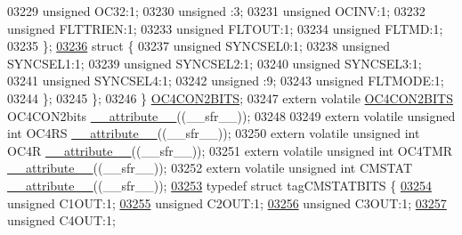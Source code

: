 \begin{DoxyCode}
03229       \textcolor{keywordtype}{unsigned} OC32:1;
03230       \textcolor{keywordtype}{unsigned} :3;
03231       \textcolor{keywordtype}{unsigned} OCINV:1;
03232       \textcolor{keywordtype}{unsigned} FLTTRIEN:1;
03233       \textcolor{keywordtype}{unsigned} FLTOUT:1;
03234       \textcolor{keywordtype}{unsigned} FLTMD:1;
03235     \};
\hypertarget{a00015_source_l03236}{}\hyperlink{a00015}{03236}     \textcolor{keyword}{struct }\{
03237       \textcolor{keywordtype}{unsigned} SYNCSEL0:1;
03238       \textcolor{keywordtype}{unsigned} SYNCSEL1:1;
03239       \textcolor{keywordtype}{unsigned} SYNCSEL2:1;
03240       \textcolor{keywordtype}{unsigned} SYNCSEL3:1;
03241       \textcolor{keywordtype}{unsigned} SYNCSEL4:1;
03242       \textcolor{keywordtype}{unsigned} :9;
03243       \textcolor{keywordtype}{unsigned} FLTMODE:1;
03244     \};
03245   \};
03246 \} \hyperlink{a00014_d9/d1d/a00633}{OC4CON2BITS};
03247 \textcolor{keyword}{extern} \textcolor{keyword}{volatile} \hyperlink{a00014_d9/d1d/a00633}{OC4CON2BITS} OC4CON2bits \hyperlink{a00015_a493c46f03454991ccc5aa7a6e1dfb2a7}{\_\_attribute\_\_}((\_\_sfr\_\_));
03248 
03249 \textcolor{keyword}{extern} \textcolor{keyword}{volatile} \textcolor{keywordtype}{unsigned} \textcolor{keywordtype}{int}  OC4RS \hyperlink{a00015_a493c46f03454991ccc5aa7a6e1dfb2a7}{\_\_attribute\_\_}((\_\_sfr\_\_));
03250 \textcolor{keyword}{extern} \textcolor{keyword}{volatile} \textcolor{keywordtype}{unsigned} \textcolor{keywordtype}{int}  OC4R \hyperlink{a00015_a493c46f03454991ccc5aa7a6e1dfb2a7}{\_\_attribute\_\_}((\_\_sfr\_\_));
03251 \textcolor{keyword}{extern} \textcolor{keyword}{volatile} \textcolor{keywordtype}{unsigned} \textcolor{keywordtype}{int}  OC4TMR \hyperlink{a00015_a493c46f03454991ccc5aa7a6e1dfb2a7}{\_\_attribute\_\_}((\_\_sfr\_\_));
03252 \textcolor{keyword}{extern} \textcolor{keyword}{volatile} \textcolor{keywordtype}{unsigned} \textcolor{keywordtype}{int}  CMSTAT \hyperlink{a00015_a493c46f03454991ccc5aa7a6e1dfb2a7}{\_\_attribute\_\_}((\_\_sfr\_\_));
\hypertarget{a00015_source_l03253}{}\hyperlink{a00014}{03253} \textcolor{keyword}{typedef} \textcolor{keyword}{struct }tagCMSTATBITS \{
\hypertarget{a00015_source_l03254}{}\hyperlink{a00014_ac92ec38a908579dba4576b58d83b448b}{03254}   \textcolor{keywordtype}{unsigned} C1OUT:1;
\hypertarget{a00015_source_l03255}{}\hyperlink{a00014_a97b4baf2ebfd7bb4d0a6f4be6665c7ab}{03255}   \textcolor{keywordtype}{unsigned} C2OUT:1;
\hypertarget{a00015_source_l03256}{}\hyperlink{a00014_a1168ba74c2f65affe96009728486d762}{03256}   \textcolor{keywordtype}{unsigned} C3OUT:1;
\hypertarget{a00015_source_l03257}{}\hyperlink{a00014_a0207c3cbe8e0aa0c9377a6001273e3cd}{03257}   \textcolor{keywordtype}{unsigned} C4OUT:1;

\end{DoxyCode}
